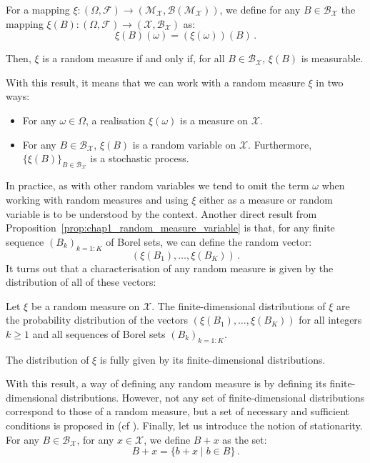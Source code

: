 \begin{proposition}{\parencite[Proposition 1.1.7]{Baccelli2020}}\label{prop:chap1_random_measure_variable}

    For a mapping $\xi:(\Omega, \mathcal{F}) \to (\mathcal{M}_{\mathcal{X}}, \mathcal{B}(\mathcal{M}_{\mathcal{X}}))$, we define for any $B\in\mathcal{B}_{\mathcal{X}}$ the mapping $\xi(B):(\Omega, \mathcal{F}) \to (\mathcal{X}, \mathcal{B}_{\mathcal{X}})$ as:
    \[\xi(B)(\omega) = (\xi(\omega))(B)\,.\]

    Then, $\xi$ is a random measure if and only if, for all $B\in\mathcal{B}_{\mathcal{X}}$, $\xi(B)$ is measurable.
\end{proposition}
With this result, it means that we can work with a random measure $\xi$ in two ways:
\begin{itemize}
    \item For any $\omega\in\Omega$, a realisation $\xi(\omega)$ is a measure on $\mathcal{X}$.
    \item For any $B\in\mathcal{B}_{\mathcal{X}}$, $\xi(B)$ is a random variable on $\mathcal{X}$. Furthermore, $\{\xi(B)\}_{B\in\mathcal{B}_{\mathcal{X}}}$ is a stochastic process.
\end{itemize}
In practice, as with other random variables we tend to omit the term $\omega$ when working with random measures and using $\xi$ either as a measure or random variable is to be understood by the context.
Another direct result from Proposition~\ref{prop:chap1_random_measure_variable} is that, for any finite sequence $(B_k)_{k=1:K}$ of Borel sets, we can define the random vector:
\[(\xi(B_1), \ldots, \xi(B_K))\,.\]
It turns out that a characterisation of any random measure is given by the distribution of all of these vectors:

\begin{proposition}{\parencite[Corollary 9.2.IV]{DaleyV2}}

    Let $\xi$ be a random measure on $\mathcal{X}$. 
    The finite-dimensional distributions of $\xi$ are the probability distribution of the vectors $(\xi(B_1), \ldots, \xi(B_K))$ for all integers $k\geq 1$ and all sequences of Borel sets $(B_k)_{k=1:K}$.

    The distribution of $\xi$ is fully given by its finite-dimensional distributions.
\end{proposition}
With this result, a way of defining any random measure is by defining its finite-dimensional distributions.
However, not any set of finite-dimensional distributions correspond to those of a random measure, but a set of necessary and sufficient conditions is proposed in (cf \parencite[Conditions 9.2.V-VI]{DaleyV2}).
Finally, let us introduce the notion of stationarity. 
For any $B\in\mathcal{B}_{\mathcal{X}}$, for any $x\in\mathcal{X}$, we define $B+x$ as the set:
\[B+x = \{b + x \mid b\in B\}\,.\]

